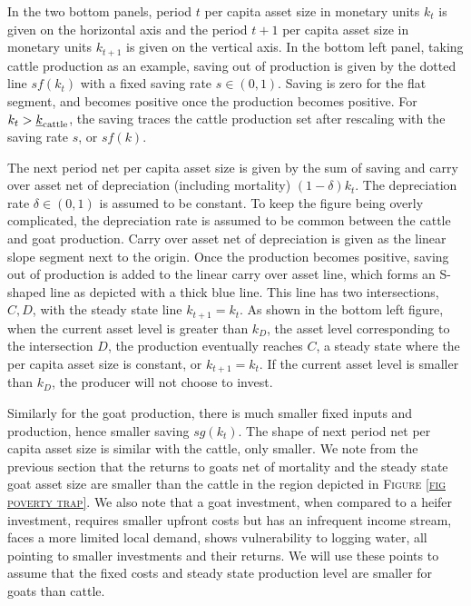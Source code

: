 	In the two bottom panels, period $t$ per capita asset size in monetary units $k_{t}$ is given on the horizontal axis and the period $t+1$ per capita asset size in monetary units $k_{t+1}$ is given on the vertical axis. In the bottom left panel, taking cattle production as an example, saving out of production is given by the dotted line $sf(k_{t})$ with a fixed saving rate $s\in(0, 1)$. Saving is zero for the flat segment, and becomes positive once the production becomes positive. For $k_{t}>\underline{k}_{\mbox{\scriptsize cattle}}$, the saving traces the cattle production set after rescaling with the saving rate $s$, or $sf(k)$. 
	
	The next period net per capita asset size is given by the sum of saving and carry over asset net of depreciation (including mortality) $(1-\delta)k_{t}$.  The depreciation rate $\delta\in(0, 1)$ is assumed to be constant. To keep the figure being overly complicated, the depreciation rate is assumed to be common between the cattle and goat production. Carry over asset net of depreciation is given as the linear slope segment next to the origin. Once the production becomes positive, saving out of production is added to the linear carry over asset line, which forms an S-shaped line as depicted with a thick blue line. This line has two intersections, $C, D$, with the steady state line $k_{t+1}=k_{t}$. As shown in the bottom left figure, when the current asset level is greater than $k_{D}$, the asset level corresponding to the intersection $D$, the production eventually reaches $C$, a steady state where the per capita asset size is constant, or $k_{t+1}=k_{t}$. If the current asset level is smaller than $k_{D}$, the producer will not choose to invest.
	
	Similarly for the goat production, there is much smaller fixed inputs and production, hence smaller saving $sg(k_{t})$. The shape of next period net per capita asset size is similar with the cattle, only smaller. We note from the previous section that the returns to goats net of mortality and the steady state goat asset size are smaller than the cattle in the region depicted in \textsc{\small Figure \ref{fig poverty trap}}. We also note that a goat investment, when compared to a heifer investment, requires smaller upfront costs but has an infrequent income stream, faces a more limited local demand, shows vulnerability to logging water, all pointing to smaller investments and their returns. We will use these points to assume that the fixed costs and steady state production level are smaller for goats than cattle.  

